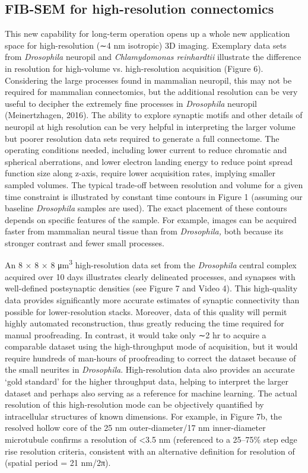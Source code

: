 \documentclass{article}
\begin{document}
\subsection*{FIB-SEM for high-resolution connectomics}

This new capability for long-term operation opens up a whole new application space for high-resolution (∼4 nm isotropic) 3D imaging. Exemplary data sets from \emph{Drosophila} neuropil and \emph{Chlamydomonas reinhardtii} illustrate the difference in resolution for high-volume vs. high-resolution acquisition (Figure 6). Considering the large processes found in mammalian neuropil, this may not be required for mammalian connectomics, but the additional resolution can be very useful to decipher the extremely fine processes in \emph{Drosophila} neuropil (Meinertzhagen, 2016). The ability to explore synaptic motifs and other details of neuropil at high resolution can be very helpful in interpreting the larger volume but poorer resolution data sets required to generate a full connectome. The operating conditions needed, including lower current to reduce chromatic and spherical aberrations, and lower electron landing energy to reduce point spread function size along z-axis, require lower acquisition rates, implying smaller sampled volumes. The typical trade-off between resolution and volume for a given time constraint is illustrated by constant time contours in Figure 1 (assuming our baseline \emph{Drosophila} samples are used). The exact placement of these contours depends on specific features of the sample. For example, images can be acquired faster from mammalian neural tissue than from \emph{Drosophila,} both because its stronger contrast and fewer small processes.

An 8 × 8 × 8 μm\textsuperscript{3} high-resolution data set from the \emph{Drosophila} central complex acquired over 10 days illustrates clearly delineated processes, and synapses with well-defined postsynaptic densities (see Figure 7 and Video 4). This high-quality data provides significantly more accurate estimates of synaptic connectivity than possible for lower-resolution stacks. Moreover, data of this quality will permit highly automated reconstruction, thus greatly reducing the time required for manual proofreading. In contrast, it would take only ∼2 hr to acquire a comparable dataset using the high-throughput mode of acquisition, but it would require hundreds of man-hours of proofreading to correct the dataset because of the small neurites in \emph{Drosophila}. High-resolution data also provides an accurate ‘gold standard’ for the higher throughput data, helping to interpret the larger dataset and perhaps also serving as a reference for machine learning. The actual resolution of this high-resolution mode can be objectively quantified by intracellular structures of known dimensions. For example, in Figure 7b, the resolved hollow core of the 25 nm outer-diameter/17 nm inner-diameter microtubule confirms a resolution of <3.5 nm (referenced to a 25–75\% step edge rise resolution criteria, consistent with an alternative definition for resolution of (spatial period = 21 nm/2π).
\end{document}

